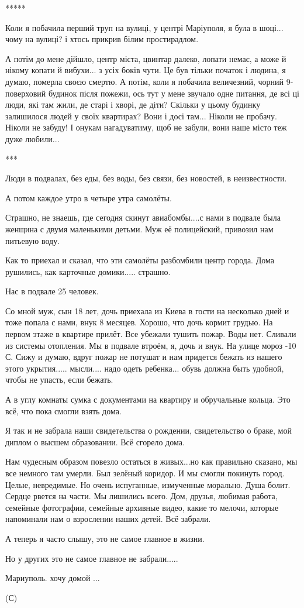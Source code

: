 *****

Коли я побачила перший труп на вулиці, у центрі Маріуполя, я була в шоці...
чому на вулиці?  і хтось прикрив білим простирадлом.  

А потім до мене дійшло, центр міста, цвинтар далеко, лопати немає, а може й
нікому копати й вибухи... з усіх боків чути.  Це був тільки початок і людина, я
думаю, померла своєю смертю.  А потім, коли я побачила величезний, чорний
9-поверховий будинок після пожежи, ось тут у мене звучало одне питання, де всі
ці люди, які там жили, де старі і хворі, де діти?  Скільки у цьому будинку
залишилося людей у своїх квартирах? Вони і досі там... Ніколи не пробачу.
Ніколи не забуду!  І онукам нагадуватиму, щоб не забули, вони наше місто теж
дуже любили...

***

Люди в подвалах, без еды, без воды, без связи, без новостей, в неизвестности. 

А потом каждое утро в четыре утра самолёты. 

Страшно, не знаешь, где сегодня скинут авиабомбы....с нами в подвале была
женщина с двумя маленькими детьми. Муж её полицейский, привозил нам питьевую
воду. 

Как то приехал и сказал, что эти самолёты разбомбили центр города. Дома
рушились, как карточные домики..... страшно. 

Нас в подвале 25 человек. 

Со мной муж, сын 18 лет, дочь приехала из Киева в гости на несколько дней и
тоже попала с нами, внук 8 месяцев. Хорошо, что дочь кормит грудью. На первом
этаже в квартире прилёт. Все убежали тушить пожар. Воды нет. Сливали из системы
отопления. Мы в подвале втроём, я, дочь и внук. На улице мороз -10 С. Сижу и
думаю, вдруг пожар не потушат и нам придется бежать из нашего этого
укрытия..... мысли.... надо одеть ребенка... обувь должна быть удобной, чтобы
не упасть, если бежать. 

А в углу комнаты сумка с документами на квартиру и обручальные кольца. Это всё,
что пока смогли взять дома. 

Я так и не забрала наши свидетельства о рождении, свидетельство о браке, мой
диплом о высшем образовании. Всё сгорело дома. 

Нам чудесным образом повезло остаться в живых...но как правильно сказано, мы
все немного там умерли. Был зелёный коридор. И мы смогли покинуть город. Целые,
невредимые. Но очень испуганные, измученные морально. Душа болит. Сердце рвется
на части. Мы лишились всего. Дом, друзья, любимая работа, семейные фотографии,
семейные архивные видео, какие то мелочи, которые напоминали нам о взрослении
наших детей. Всё забрали.

А теперь я часто слышу, это не самое главное в жизни.

Но у других это не самое главное не забрали.....

Мариуполь. хочу домой ...

(С)
